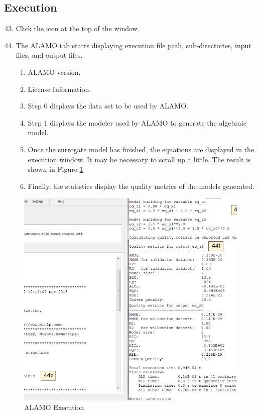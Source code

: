 \subsection{Execution}

\begin{enumerate}
	\setcounter{enumi}{42}
	\item Click the  icon at the top of the window.
	\item The ALAMO  tab starts displaying execution file path, sub-directories, input files, and output files.
\begin{enumerate}
	\item ALAMO version.
	\item License Information.
	\item Step 0 displays the data set to be used by ALAMO.
	\item Step 1 displays the modeler used by ALAMO to generate the algebraic model.
	\item Once the surrogate model has finished, the equations are displayed in the execution window. It may be necessary to scroll up a little. The result is shown in Figure \ref{fig.alamo.res}.
	\item Finally, the statistics display the quality metrics of the models generated.
\end{enumerate}
\end{enumerate}

\begin{figure}[H]
	\begin{center}
		\includegraphics[scale=0.4]{Chapt_surrogates/figs/alamo_exec}
		\caption{ALAMO Execution}
		\label{fig.alamo.res}
	\end{center}
\end{figure}

